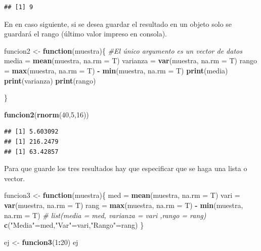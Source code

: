 \documentclass[]{book}
\newenvironment{Shaded}{\begin{snugshade}}{\end{snugshade}}
\newcommand{\KeywordTok}[1]{\textcolor[rgb]{0.13,0.29,0.53}{\textbf{#1}}}
\newcommand{\DataTypeTok}[1]{\textcolor[rgb]{0.13,0.29,0.53}{#1}}
\newcommand{\DecValTok}[1]{\textcolor[rgb]{0.00,0.00,0.81}{#1}}
\newcommand{\StringTok}[1]{\textcolor[rgb]{0.31,0.60,0.02}{#1}}
\newcommand{\CommentTok}[1]{\textcolor[rgb]{0.56,0.35,0.01}{\textit{#1}}}
\newcommand{\ControlFlowTok}[1]{\textcolor[rgb]{0.13,0.29,0.53}{\textbf{#1}}}
\newcommand{\OperatorTok}[1]{\textcolor[rgb]{0.81,0.36,0.00}{\textbf{#1}}}
\newcommand{\NormalTok}[1]{#1}
\begin{document}
\begin{verbatim}
## [1] 9
\end{verbatim}

En en caso siguiente, si se desea guardar el resultado en un objeto solo
se guardará el rango (último valor impreso en consola).

\begin{Shaded}
\begin{Highlighting}[]
\NormalTok{funcion2 <-}\StringTok{ }\ControlFlowTok{function}\NormalTok{(muestra)\{     }\CommentTok{#El único argumento es un vector de datos}
\NormalTok{  media =}\StringTok{ }\KeywordTok{mean}\NormalTok{(muestra, }\DataTypeTok{na.rm =}\NormalTok{ T)}
\NormalTok{  varianza =}\StringTok{ }\KeywordTok{var}\NormalTok{(muestra, }\DataTypeTok{na.rm =}\NormalTok{ T)}
\NormalTok{  rango =}\StringTok{ }\KeywordTok{max}\NormalTok{(muestra, }\DataTypeTok{na.rm =}\NormalTok{ T) }\OperatorTok{-}\StringTok{ }\KeywordTok{min}\NormalTok{(muestra, }\DataTypeTok{na.rm =}\NormalTok{ T)}
  \KeywordTok{print}\NormalTok{(media)}
  \KeywordTok{print}\NormalTok{(varianza)}
  \KeywordTok{print}\NormalTok{(rango)}

\NormalTok{\}}

\KeywordTok{funcion2}\NormalTok{(}\KeywordTok{rnorm}\NormalTok{(}\DecValTok{40}\NormalTok{,}\DecValTok{5}\NormalTok{,}\DecValTok{16}\NormalTok{))}
\end{Highlighting}
\end{Shaded}

\begin{verbatim}
## [1] 5.603092
## [1] 216.2479
## [1] 63.42857
\end{verbatim}

Para que guarde los tres resultados hay que especificar que se haga una
lista o vector.

\begin{Shaded}
\begin{Highlighting}[]
\NormalTok{funcion3 <-}\StringTok{ }\ControlFlowTok{function}\NormalTok{(muestra)\{     }
\NormalTok{  med =}\StringTok{ }\KeywordTok{mean}\NormalTok{(muestra, }\DataTypeTok{na.rm =}\NormalTok{ T)}
\NormalTok{  vari =}\StringTok{ }\KeywordTok{var}\NormalTok{(muestra, }\DataTypeTok{na.rm =}\NormalTok{ T)}
\NormalTok{  rang =}\StringTok{ }\KeywordTok{max}\NormalTok{(muestra, }\DataTypeTok{na.rm =}\NormalTok{ T) }\OperatorTok{-}\StringTok{ }\KeywordTok{min}\NormalTok{(muestra, }\DataTypeTok{na.rm =}\NormalTok{ T)}
  \CommentTok{# list(media = med, varianza = vari ,rango = rang)}
  \KeywordTok{c}\NormalTok{(}\StringTok{"Media"}\NormalTok{=med,}\StringTok{"Var"}\NormalTok{=vari,}\StringTok{"Rango"}\NormalTok{=rang)}
\NormalTok{\}}

\NormalTok{ej <-}\StringTok{ }\KeywordTok{funcion3}\NormalTok{(}\DecValTok{1}\OperatorTok{:}\DecValTok{20}\NormalTok{)}
\NormalTok{ej}
\end{Highlighting}
\end{Shaded}
\end{document}
